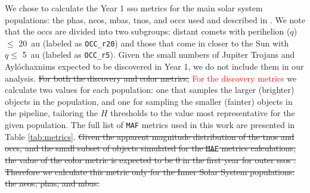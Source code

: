 \documentclass[preprintm,linenumbers]{aastex631}
\newcommand{\maf}{\texttt{MAF}\xspace}
\newcommand{\occrfive}{\texttt{OCC\_r5}\xspace}
\newcommand{\occrtwenty}{\texttt{OCC\_r20}\xspace}
\providecommand{\red}[1]{\textcolor{red}{#1}}
\begin{document}
We chose to calculate the Year 1 \gls*{sso} metrics for the main solar system populations: the \glspl*{pha}, \glspl*{neo}, \glspl*{mba}, \glspl*{tno}, and \glspl*{occ} used and described in \cite{schwambTuningLegacySurvey2023}. 
We note that the \glspl*{occ} are divided into two subgroups: distant comets with perihelion ($q$) $\le$ 20\ au (labeled as \occrtwenty) and those that come in closer to the Sun with $q \le$ 5\ au (labeled as \occrfive). %
Given the small numbers of Jupiter Trojans and \textquotesingle Ayl\'{o}\textquotesingle chaxnims \citep[Inner Venus objects;][]{bolinDiscoveryCharacterizationKilometre2022,2025Icar..42516333B} expected to be discovered in Year 1, we do not include them in our analysis. 
\sout{For both the discovery and color metrics,} \red{For the discovery metrics} we calculate two values for each population: one that samples the larger (brighter) objects in the population, and one for sampling the smaller (fainter) objects in the pipeline, tailoring the $H$ thresholds to the value most representative for the given population. 
The full list of \maf metrics used in this work are presented in Table \ref{tab:metrics}. 
\sout{Given the apparent magnitude distribution of the \glspl*{tno} and \glspl*{occ}, and the small subset of objects simulated for the \maf metrics calculations, the value of the color metric is expected to be 0 in the first year for outer \glspl*{sso} \citep{schwambTuningLegacySurvey2023}. 
Therefore we calculate this metric only for the Inner Solar System populations: the \glspl*{neo}, \glspl*{pha}, and \glspl*{mba}.} 		
		
\end{document}
